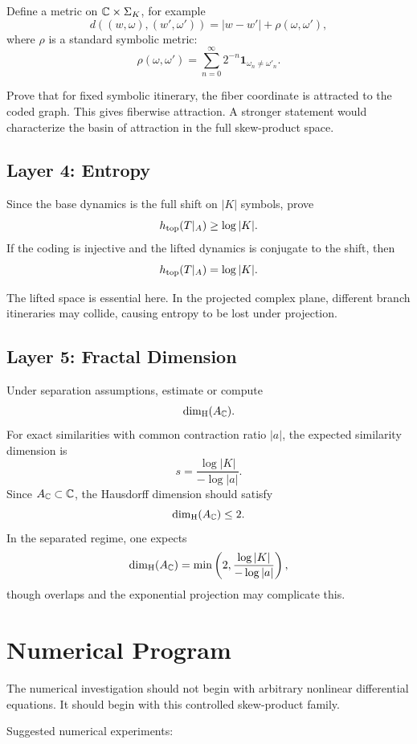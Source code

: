 	Define a metric on \(\mathbb{C}\times\Sigma_K\), for example
	\[
	d((w,\omega),(w',\omega'))
	=
	|w-w'|+\rho(\omega,\omega'),
	\]
	where \(\rho\) is a standard symbolic metric:
	\[
	\rho(\omega,\omega')
	=
	\sum_{n=0}^{\infty} 2^{-n}
	\mathbf{1}_{\omega_n\neq\omega'_n}.
	\]
	
	Prove that for fixed symbolic itinerary, the fiber coordinate is attracted to the coded graph. This gives fiberwise attraction. A stronger statement would characterize the basin of attraction in the full skew-product space.
	
	\subsection{Layer 4: Entropy}
	
	Since the base dynamics is the full shift on \(|K|\) symbols, prove
	\[
	h_{\mathrm{top}}(T|_A)\geq \log |K|.
	\]
	If the coding is injective and the lifted dynamics is conjugate to the shift, then
	\[
	h_{\mathrm{top}}(T|_A)=\log |K|.
	\]
	
	The lifted space is essential here. In the projected complex plane, different branch itineraries may collide, causing entropy to be lost under projection.
	
	\subsection{Layer 5: Fractal Dimension}
	
	Under separation assumptions, estimate or compute
	\[
	\dim_{\mathrm H}(A_{\mathbb{C}}).
	\]
	For exact similarities with common contraction ratio \(|a|\), the expected similarity dimension is
	\[
	s=\frac{\log |K|}{-\log |a|}.
	\]
	Since \(A_{\mathbb{C}}\subset\mathbb{C}\), the Hausdorff dimension should satisfy
	\[
	\dim_{\mathrm H}(A_{\mathbb{C}})\leq 2.
	\]
	In the separated regime, one expects
	\[
	\dim_{\mathrm H}(A_{\mathbb{C}})=\min\left(2,\frac{\log |K|}{-\log |a|}\right),
	\]
	though overlaps and the exponential projection may complicate this.
	
	\section{Numerical Program}
	
	The numerical investigation should not begin with arbitrary nonlinear differential equations. It should begin with this controlled skew-product family.
	
	Suggested numerical experiments:
	

